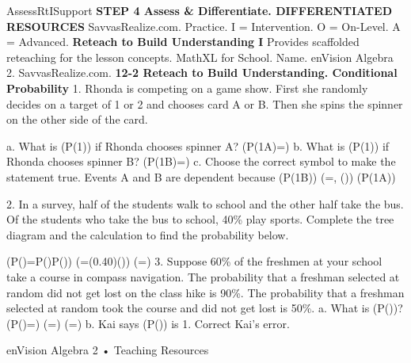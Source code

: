 \documentclass{article}
\newenvironment{te-addendum}[2]{}{}     %
\newcommand{\answer}[1]{}               %
\newcommand{\placeholder}[2]{}          %
\newcommand{\te}[1]{}                   %
\begin{document}
\begin{te-addendum}{Assess}{RtISupport}
\textbf{STEP 4 Assess \& Differentiate. DIFFERENTIATED RESOURCES}
SavvasRealize.com. Practice. I = Intervention. O = On-Level. A = Advanced.
\textbf{Reteach to Build Understanding I}
Provides scaffolded reteaching for the lesson concepts. MathXL for School.
Name. enVision Algebra 2. SavvasRealize.com.
\textbf{12-2 Reteach to Build Understanding. Conditional Probability}
1. Rhonda is competing on a game show. First she randomly decides on a target of 1 or 2 and chooses card A or B. Then she spins the spinner on the other side of the card.
\placeholder{diagram}{Front A: gray square. Back A: four equal square quadrants with 1 upper left/lower right, 2 upper right/lower left; arrow points upper right. Front B: gray square. Back B: 1 in three quadrants, 2 upper right; arrow points upper right. Headings Front, Back, Front, Back.}
a. What is (P(1)) if Rhonda chooses spinner A? (P(1\mid A)=\answer{0.5})
b. What is (P(1)) if Rhonda chooses spinner B? (P(1\mid B)=\answer{0.75})
c. Choose the correct symbol to make the statement true.
Events A and B are dependent because (P(1\mid B)) (=, (\neq)) (P(1\mid A))
\answer{(\neq)}
\te{Printed events A and B; the displayed comparison concerns outcome 1 conditional on the choice of spinner.}
2. In a survey, half of the students walk to school and the other half take the bus. Of the students who take the bus to school, 40\% play sports. Complete the tree diagram and the calculation to find the probability below.
\placeholder{diagram}{Tree: first split walk 0.5 and bus answer 0.5. Walk splits sports 0.35 and no sports 0.65. Bus splits sports answer 0.4 and no sports answer 0.6.}
\answer{Tree blanks: 0.5, 0.4, 0.6.}
(P()=P(\mid{})\cdot P(\answer{\text{bus}}))
(=(0.40)(\answer{0.5}))
(=\answer{0.2})
3. Suppose 60\% of the freshmen at your school take a course in compass navigation. The probability that a freshman selected at random did not get lost on the class hike is 90\%. The probability that a freshman selected at random took the course and did not get lost is 50\%.
a. What is (P(\mid{}))?
(P(\mid{})=)
(=\frac{0.5}{\answer{0.6}})
(=\answer{\text{about }0.83})
b. Kai says (P(\mid{})) is 1. Correct Kai's error.
\answer{The probability is (\frac{0.5}{0.9}), or about 0.56.}
enVision Algebra 2 • Teaching Resources
\end{te-addendum}
\end{document}
